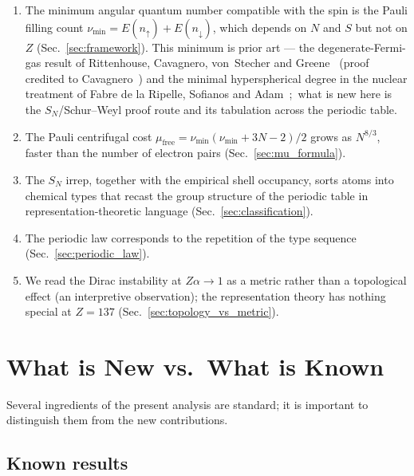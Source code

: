 \documentclass[aps,prl,twocolumn,superscriptaddress,longbibliography]{revtex4-2}
\newcommand{\mufree}{\mu_{\mathrm{free}}}
\begin{document}
\begin{enumerate}
  \item The minimum angular quantum number compatible with the spin
    is the Pauli filling count $\nu_{\min} = E(n_\uparrow) +
    E(n_\downarrow)$, which depends on $N$ and $S$ but not on $Z$
    (Sec.~\ref{sec:framework}).  This minimum is prior art --- the
    degenerate-Fermi-gas result of Rittenhouse, Cavagnero, von~Stecher
    and Greene~\cite{Rittenhouse2006} (proof credited to
    Cavagnero~\cite{Cavagnero1986}) and the minimal hyperspherical degree in the
    nuclear treatment of Fabre de la Ripelle, Sofianos and
    Adam~\cite{FabreDeLaRipelle2004};\ what is new here is the
    $S_N$/Schur--Weyl proof route and its tabulation across the
    periodic table.
  \item The Pauli centrifugal cost $\mufree = \nu_{\min}(\nu_{\min} +
    3N-2)/2$ grows as $N^{8/3}$, faster than the number of electron
    pairs (Sec.~\ref{sec:mu_formula}).
  \item The $S_N$ irrep, together with the empirical shell occupancy,
    sorts atoms into chemical types that recast the group structure of
    the periodic table in representation-theoretic language
    (Sec.~\ref{sec:classification}).
  \item The periodic law corresponds to the repetition of the type
    sequence (Sec.~\ref{sec:periodic_law}).
  \item We read the Dirac instability at $Z\alpha \to 1$ as a metric
    rather than a topological effect (an interpretive observation);
    the representation theory has nothing special at $Z = 137$
    (Sec.~\ref{sec:topology_vs_metric}).
\end{enumerate}


\section{What is New vs.\ What is Known}
\label{sec:new_vs_known}

Several ingredients of the present analysis are standard; it is
important to distinguish them from the new contributions.

\subsection{Known results}
\end{document}
